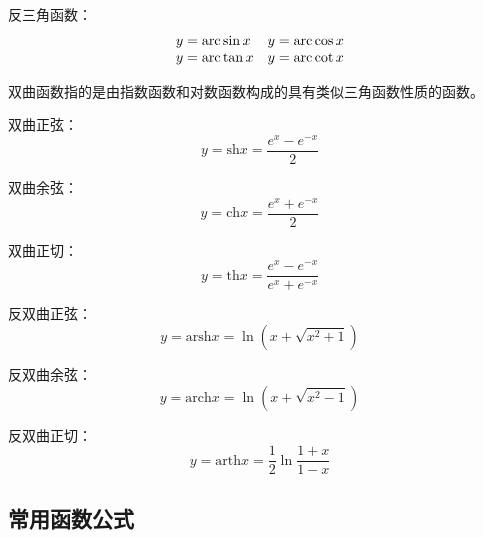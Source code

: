 反三角函数：
\[
\begin{matrix}
	y=\mathrm{arc}\sin x \hfill & y=\mathrm{arc}\cos x \hfill \\
	y=\mathrm{arc}\tan x \hfill & y=\mathrm{arc}\cot x \hfill \\
\end{matrix}
\]

双曲函数指的是由指数函数和对数函数构成的具有类似三角函数性质的函数。

双曲正弦：
\[
y=\mathrm{sh}x=\frac{e^x-e^{-x}}{2}
\]

双曲余弦：
\[
y=\mathrm{ch}x=\frac{e^x+e^{-x}}{2}
\]

双曲正切：
\[
y=\mathrm{th}x=\frac{e^x-e^{-x}}{e^x+e^{-x}}
\]

反双曲正弦：
\[
y=\mathrm{arsh}x=\ln \left( x+\sqrt{x^2+1} \right)
\]

反双曲余弦：
\[
y=\mathrm{arch}x=\ln \left( x+\sqrt{x^2-1} \right)
\]

反双曲正切：
\[
y=\mathrm{arth}x=\frac{1}{2}\ln \frac{1+x}{1-x}
\]

\subsection{常用函数公式}


